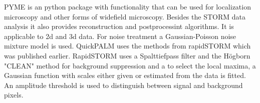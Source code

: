 PYME \cite{PYME} is an python package with functionality that can be used for localization microscopy and other forms of widefield microscopy. Besides the STORM data analysis it also provides reconstruction and postprocessint algorithms. It is applicable to 2d and 3d data. For noise treatment a Gaussian-Poisson noise mixture model is used.\newline
QuickPALM \cite{quickpalm} uses the methods from rapidSTORM \cite{rapidstorm} which was published earlier. RapidSTORM uses a Spalttiefpass filter and the H\"ogborn "CLEAN" method for background suppression and a to select the local maxima, a Gaussian function with scales either given or estimated from the data is fitted. An amplitude threshold is used to distinguish between signal and background pixels. 